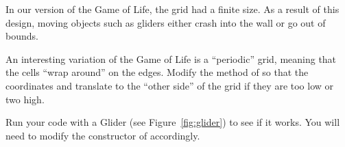 \begin{exercise}
In our version of the Game of Life, the grid had a finite size.
As a result of this design, moving objects such as gliders either crash into the wall or go out of bounds.

An interesting variation of the Game of Life is a ``periodic'' grid, meaning that the cells ``wrap around'' on the edges.
Modify the  method of  so that the coordinates  and  translate to the ``other side'' of the grid if they are too low or two high.

Run your code with a Glider (see Figure~\ref{fig:glider}) to see if it works.
You will need to modify the constructor of  accordingly.
\end{exercise}




